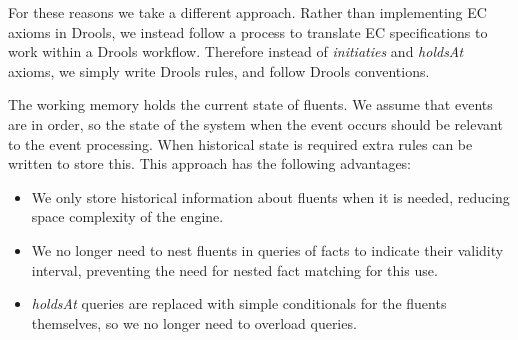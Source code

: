
For these reasons we take a different approach. Rather than implementing \ac{EC}
axioms in Drools, we instead follow a process to translate \ac{EC}
specifications to work within a Drools workflow. Therefore instead of \emph{initiaties}
and \emph{holdsAt} axioms, we simply write Drools rules, and follow Drools
conventions.

The working memory holds the current state of fluents. We assume that events
are in order, so the state of the system when the event occurs should be
relevant to the event processing. When historical state is required extra
rules can be written to store this. This approach has the following advantages:
\begin{itemize}
\item We only store historical information about fluents when it is needed,
reducing space complexity of the engine.
\item We no longer need to nest fluents in queries of facts to indicate
their validity interval, preventing the need for nested fact matching for this
use.
\item \emph{holdsAt} queries are replaced with simple conditionals for the
fluents themselves, so we no longer need to overload queries.
\end{itemize}

